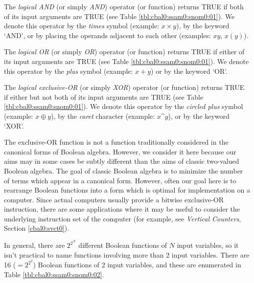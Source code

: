 The \emph{logical AND} (or simply \emph{AND}) 
operator (or function)
returns TRUE if both of its input arguments are TRUE 
(see Table 
\ref{tbl:cbal0:ssam0:snom0:01}).
We denote this operator
by the \emph{times} symbol (example: $x \times{} y$), by
the keyword `AND', or by placing the operands adjacent to
each other (examples: $xy$, $x(y)$).

The \emph{logical OR}
(or simply \emph{OR}) 
operator (or function)
returns TRUE if either of its input arguments are TRUE 
(see Table 
\ref{tbl:cbal0:ssam0:snom0:01}).
We denote this operator
by the \emph{plus} symbol (example: $x + y$)  or by
the keyword `OR'.

The \emph{logical exclusive-OR}
(or simply  \emph{XOR})
operator (or function)
returns TRUE if either but not both of its input arguments are TRUE 
(see Table 
\ref{tbl:cbal0:ssam0:snom0:01}).
We denote this operator
by the \emph{circled plus} symbol (example: $x \oplus{} y$),
by the \emph{caret} character (example: $x$\^{}$y$),  or by
the keyword `XOR'.

The exclusive-OR function is not a
function traditionally considered in the canonical forms of Boolean
algebra.  However, we consider it here because our aims may in
some cases be subtly
different than the aims of classic two-valued Boolean algebra.
The goal of classic Boolean algebra is to minimize the number of
terms which appear in a canonical form.
However, often our goal here is to rearrange Boolean functions into a form
which is optimal for implementation on a computer.  Since actual
computers usually provide a bitwise exclusive-OR instruction, there
are some applications where it may be useful to consider the
underlying instruction set of the computer (for example,
see \emph{Vertical Counters},
Section \ref{cbal0:svct0}).

In general, there are $2^{2^N}$ different Boolean functions of $N$
input variables, so it isn't practical to name functions involving more
than 2 input variables.  There are 16 ($=2^{2^2}$) Boolean functions of
2 input variables, and these are enumerated in
Table \ref{tbl:cbal0:ssam0:snom0:02}.

